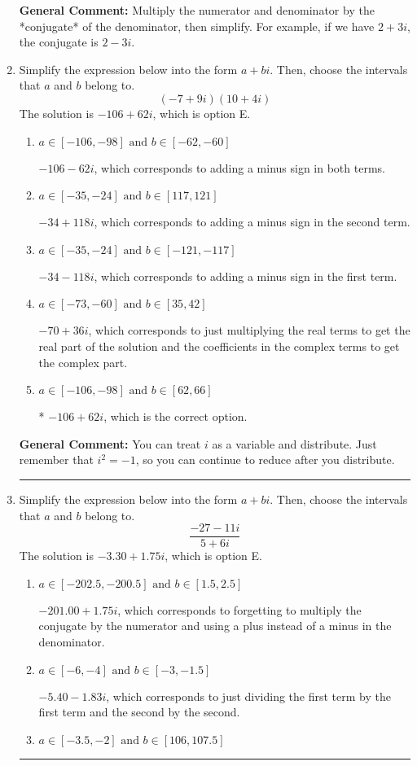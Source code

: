 \documentclass{extbook}[14pt]
\newcommand{\litem}[1]{\item #1

\rule{\textwidth}{0.4pt}}
\begin{document}
\begin{enumerate}
{\textbf{General Comment:} Multiply the numerator and denominator by the *conjugate* of the denominator, then simplify. For example, if we have $2+3i$, the conjugate is $2-3i$.
}
\litem{
Simplify the expression below into the form $a+bi$. Then, choose the intervals that $a$ and $b$ belong to.
\[ (-7 + 9 i)(10 + 4 i) \]The solution is \( -106 + 62 i \), which is option E.\begin{enumerate}[label=\Alph*.]
\item \( a \in [-106, -98] \text{ and } b \in [-62, -60] \)

 $-106 - 62 i$, which corresponds to adding a minus sign in both terms.
\item \( a \in [-35, -24] \text{ and } b \in [117, 121] \)

 $-34 + 118 i$, which corresponds to adding a minus sign in the second term.
\item \( a \in [-35, -24] \text{ and } b \in [-121, -117] \)

 $-34 - 118 i$, which corresponds to adding a minus sign in the first term.
\item \( a \in [-73, -60] \text{ and } b \in [35, 42] \)

 $-70 + 36 i$, which corresponds to just multiplying the real terms to get the real part of the solution and the coefficients in the complex terms to get the complex part.
\item \( a \in [-106, -98] \text{ and } b \in [62, 66] \)

* $-106 + 62 i$, which is the correct option.
\end{enumerate}

\textbf{General Comment:} You can treat $i$ as a variable and distribute. Just remember that $i^2=-1$, so you can continue to reduce after you distribute.
}
\litem{
Simplify the expression below into the form $a+bi$. Then, choose the intervals that $a$ and $b$ belong to.
\[ \frac{-27 - 11 i}{5 + 6 i} \]The solution is \( -3.30  + 1.75 i \), which is option E.\begin{enumerate}[label=\Alph*.]
\item \( a \in [-202.5, -200.5] \text{ and } b \in [1.5, 2.5] \)

 $-201.00  + 1.75 i$, which corresponds to forgetting to multiply the conjugate by the numerator and using a plus instead of a minus in the denominator.
\item \( a \in [-6, -4] \text{ and } b \in [-3, -1.5] \)

 $-5.40  - 1.83 i$, which corresponds to just dividing the first term by the first term and the second by the second.
\item \( a \in [-3.5, -2] \text{ and } b \in [106, 107.5] \)


\end{enumerate}}
\end{enumerate}
\end{document}
